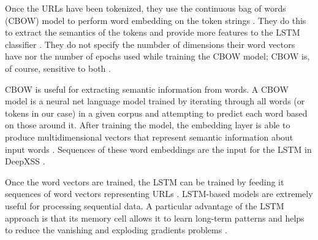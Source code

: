 Once the URLs have been tokenized, they use the continuous bag of words (CBOW) model to perform word embedding on the token strings \cite{fang2018deepxss}. They do this to extract the semantics of the tokens and provide more features to the LSTM classifier \cite{fang2018deepxss}. They do not specify the numbder of dimensions their word vectors have nor the number of epochs used while training the CBOW model; CBOW is, of course, sensitive to both \cite{mikolov2013efficient}.

CBOW is useful for extracting semantic information from words. A CBOW model is a neural net language model trained by iterating through all words (or tokens in our case) in a given corpus and attempting to predict each word based on those around it. After training the model, the embedding layer is able to produce multidimensional vectors that represent semantic information about input words \cite{mikolov2013efficient}. Sequences of these word embeddings are the input for the LSTM in DeepXSS \cite{fang2018deepxss}.

Once the word vectors are trained, the LSTM can be trained by feeding it sequences of word vectors representing URLs \cite{fang2018deepxss}. LSTM-based models are extremely useful for processing sequential data. A particular advantage of the LSTM approach is that its memory cell allows it to learn long-term patterns and helps to reduce the vanishing and exploding gradients problems \cite{LSTM}.